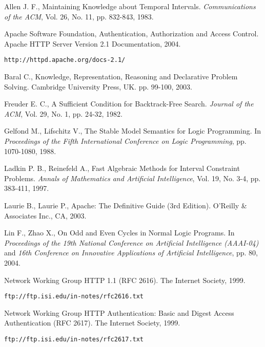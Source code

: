 \documentclass[11pt]{report}
\begin{document}
  \begin{thebibliography}{M}
      Allen J. F.,
      Maintaining Knowledge about Temporal Intervals.
      {\em Communications of the ACM},
      Vol. 26, No. 11, pp. 832-843,
      1983.

      Apache Software Foundation,
      Authentication, Authorization and Access Control.
      Apache HTTP Server Version 2.1 Documentation,
      2004.

      {\tt http://httpd.apache.org/docs-2.1/}

      Baral C.,
      Knowledge, Representation, Reasoning and Declarative Problem Solving.
      Cambridge University Press, UK.
      pp. 99-100,
      2003.

      Freuder E. C.,
      A Sufficient Condition for Backtrack-Free Search.
      {\em Journal of the ACM},
      Vol. 29, No. 1, pp. 24-32,
      1982.

      Gelfond M., Lifschitz V.,
      The Stable Model Semantics for Logic Programming.
      In {\em Proceedings of the Fifth International Conference on Logic Programming},
      pp. 1070-1080,
      1988.

      Ladkin P. B., Reinefeld A.,
      Fast Algebraic Methods for Interval Constraint Problems.
      {\em Annals of Mathematics and Artificial Intelligence},
      Vol. 19, No. 3-4, pp. 383-411,
      1997.

      Laurie B., Laurie P.,
      Apache: The Definitive Guide (3rd Edition).
      O'Reilly \& Associates Inc., CA,
      2003.

      Lin F., Zhao X.,
      On Odd and Even Cycles in Normal Logic Programs.
      In {\em Proceedings of the 19th National Conference on Artificial Intelligence (AAAI-04)}
      and {\em 16th Conference on Innovative Applications of Artificial Intelligence},
      pp. 80,
      2004.

      Network Working Group
      HTTP 1.1 (RFC 2616).
      The Internet Society, 1999.

      {\tt ftp://ftp.isi.edu/in-notes/rfc2616.txt}

      Network Working Group
      HTTP Authentication: Basic and Digest Access Authentication (RFC 2617).
      The Internet Society, 1999.

      {\tt ftp://ftp.isi.edu/in-notes/rfc2617.txt}


\end{thebibliography}
\end{document}
